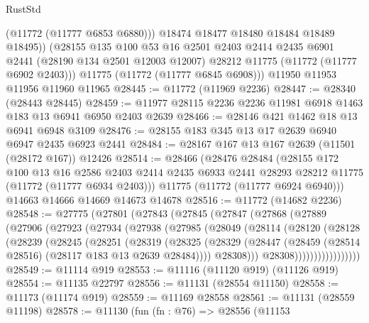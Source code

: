 \begin{lexlean}{RustStd}
\begin{coremodule}
            (@11772 (@11777 @6853 @6880)))
          @18474
          @18477
          @18480
          @18484
          @18489
          @18495))
      (@28155
        @135
        @100
        @53
        @16
        @2501
        @2403
        @2414
        @2435
        @6901
        @2441
        (@28190 @134 @2501 @12003 @12007)
        @28212
        @11775
        (@11772 (@11777 @6902 @2403)))
      @11775
      (@11772 (@11777 @6845 @6908)))
    @11950
    @11953
    @11956
    @11960
    @11965
@28445 := @11772 (@11969 @2236)
@28447 := @28340 (@28443 @28445)
@28459 := @11977 @28115 @2236 @2236 @11981 @6918 @1463 @183 @13 @6941 @6950 @2403 @2639
@28466 := @28146 @421 @1462 @18 @13 @6941 @6948 @3109
@28476 := @28155 @183 @345 @13 @17 @2639 @6940 @6947 @2435 @6923 @2441
@28484 := @28167 @167 @13 @167 @2639 (@11501 (@28172 @167)) @12426
@28514 := @28466
    (@28476
      @28484
      (@28155
        @172
        @100
        @13
        @16
        @2586
        @2403
        @2414
        @2435
        @6933
        @2441
        @28293
        @28212
        @11775
        (@11772 (@11777 @6934 @2403)))
      @11775
      (@11772 (@11777 @6924 @6940)))
    @14663
    @14666
    @14669
    @14673
    @14678
@28516 := @11772 (@14682 @2236)
@28548 := @27775
    (@27801
      (@27843
        (@27845
          (@27847
            (@27868
              (@27889
                (@27906
                  (@27923
                    (@27934
                      (@27938
                        (@27985
                          (@28049
                            (@28114
                              (@28120
                                (@28128
                                  (@28239
                                    (@28245
                                      (@28251
                                        (@28319
                                          (@28325
                                            (@28329
                                              (@28447
                                                (@28459
                                                  (@28514 @28516)
                                                  (@28117 @183 @13 @2639 @28484))))
                                            @28308)))
                                      @28308)))))))))))))))))
@28549 := @11114 @919
@28553 := @11116 (@11120 @919) (@11126 @919)
@28554 := @11135 @22797
@28556 := @11131 (@28554 @11150)
@28558 := @11173 (@11174 @919)
@28559 := @11169 @28558
@28561 := @11131 (@28559 @11198)
@28578 := @11130
    (fun (fn : @76) =>
    @28556
      (@11153

\end{coremodule}
\end{lexlean}
